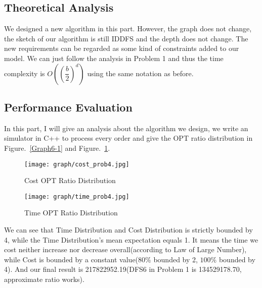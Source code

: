 \documentclass{llncs}
\begin{document}
\subsection{Theoretical Analysis}
We designed a new algorithm in this part. However, the graph does not change, the sketch of our algorithm is still IDDFS and the depth does not change. The new requirements can be regarded as some kind of constraints added to our model. We can just follow the analysis in Problem 1 and thus the time complexity is $O((\dfrac{b}{2})^d)$ using the same notation as before.
\subsection{Performance Evaluation}
In this part, I will give an analysis about the algorithm we design, we write an simulator in C++ to process every order and give the OPT ratio distribution in Figure.~\ref{Graph6-1} and Figure.~\ref{Graph6-2}.

\begin{figure}[htbp]
\centering
\begin{minipage}[t]{0.48\textwidth}
\centering
\texttt{[image: graph/cost\_prob4.jpg]}
\caption{Cost OPT Ratio Distribution}
\label{Graph6-1}
\end{minipage}
\begin{minipage}[t]{0.48\textwidth}
\centering
\texttt{[image: graph/time\_prob4.jpg]}
\caption{Time OPT Ratio Distribution}
\label{Graph6-2}
\end{minipage}
\end{figure}

We can see that Time Distribution and Cost Distribution is strictly bounded by 4, while the Time Distribution's mean expectation equals 1. It means the time we cost neither increase nor decrease overall(according to Law of Large Number), while Cost is bounded by a constant value($80\%$ bounded by 2, $100\%$ bounded by 4). And our final result is 217822952.19(DFS6 in Problem 1 is 134529178.70, approximate ratio works).
\end{document}
